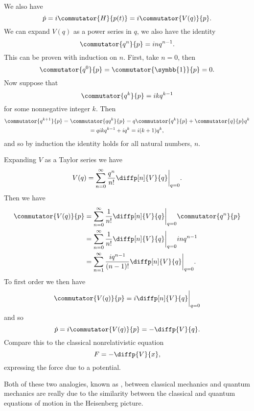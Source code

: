 \documentclass[fleqn]{NotesClass}
\newcommand{\ident}{\symbb{1}}
\begin{document}
\begin{exm}{}{}
        We also have
        \begin{equation}
            \dot{p} = i\commutator{H}{p(t)} = i\commutator{V(q)}{p}.
        \end{equation}
        We can expand \(V(q)\) as a power series in \(q\), we also have the identity
        \begin{equation}
            \commutator{q^n}{p} = inq^{n-1}.
        \end{equation}
        This can be proven with induction on \(n\).
        First, take \(n = 0\), then
        \begin{equation}
            \commutator{q^0}{p} = \commutator{\ident}{p} = 0.
        \end{equation}
        Now suppose that
        \begin{equation}
            \commutator{q^k}{p} = ikq^{k-1}
        \end{equation}
        for some nonnegative integer \(k\).
        Then
        \begin{multline}
            \commutator{q^{k+1}}{p} = \commutator{qq^k}{p} = q\commutator{q^k}{p} + \commutator{q}{p}q^k\\
            = q ikq^{k-1} + iq^k = i(k + 1)q^k,
        \end{multline}
        and so by induction the identity holds for all natural numbers, \(n\).
        
        Expanding \(V\) as a Taylor series we have
        \begin{equation}
            V(q) = \sum_{n = 0}^{\infty} \frac{q^n}{n!} \diffp[n]{V}{q}\bigg|_{q = 0}.
        \end{equation}
        Then we have
        \begin{align}
            \commutator{V(q)}{p} &= \sum_{n = 0}^{\infty} \frac{1}{n!} \diffp[n]{V}{q}\bigg|_{q = 0} \commutator{q^n}{p}\\
            &= \sum_{n = 0}^{\infty} \frac{1}{n!} \diffp[n]{V}{q}\bigg|_{q = 0} in q^{n - 1}\\
            &= \sum_{n = 1}^{\infty} \frac{iq^{n - 1}}{(n - 1)!} \diffp[n]{V}{q}\bigg|_{q = 0}.
        \end{align}
        To first order we then have
        \begin{equation}
            \commutator{V(q)}{p} = i \diffp[n]{V}{q}\bigg|_{q = 0}
        \end{equation}
        and so
        \begin{equation}
            \dot{p} = i\commutator{V(q)}{p} = -\diffp{V}{q}.
        \end{equation}
        Compare this to the classical nonrelativistic equation
        \begin{equation}
            F = -\diffp{V}{x},
        \end{equation}
        expressing the force due to a potential.
        
        Both of these two analogies, known as , between classical mechanics and quantum mechanics are really due to the similarity between the classical and quantum equations of motion in the Heisenberg picture.
    \end{exm}
    
\end{document}
